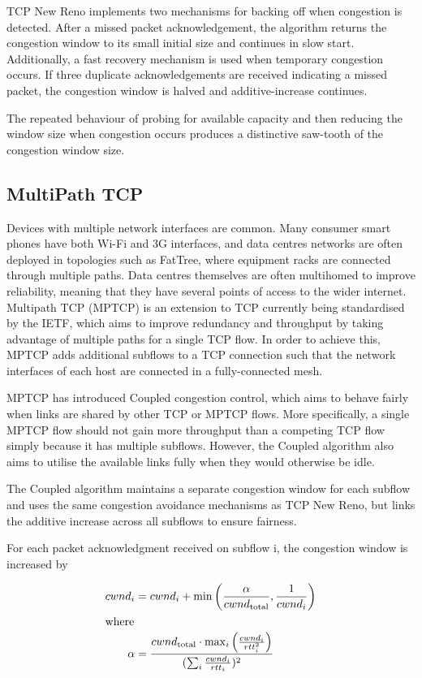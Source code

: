 TCP New Reno implements two mechanisms for backing off when congestion is
detected. After a missed packet acknowledgement, the algorithm returns the
congestion window to its small initial size and continues in slow start.
Additionally, a fast recovery mechanism is used when temporary congestion
occurs. If three duplicate acknowledgements are received indicating a missed
packet, the congestion window is halved and additive-increase continues.

The repeated behaviour of probing for available capacity and then reducing the
window size when congestion occurs produces a distinctive saw-tooth of the
congestion window size.

\subsection{MultiPath TCP}
Devices with multiple network interfaces are common. Many consumer smart phones
have both Wi-Fi and 3G interfaces, and data centres networks are often deployed
in topologies such as FatTree, where equipment racks are connected through
multiple paths. Data centres themselves are often multihomed to improve
reliability, meaning that they have several points of access to the wider
internet. Multipath TCP (MPTCP) is an extension to TCP currently being
standardised by the IETF, which aims to improve redundancy and throughput by
taking advantage of multiple paths for a single TCP flow. In order to achieve
this, MPTCP adds additional subflows to a TCP connection such that the network
interfaces of each host are connected in a fully-connected mesh.

MPTCP has introduced Coupled congestion control, which aims to behave fairly
when links are shared by other TCP or MPTCP flows. More specifically, a single
MPTCP flow should not gain more throughput than a competing TCP flow simply
because it has multiple subflows. However, the Coupled algorithm also aims to
utilise the available links fully when they would otherwise be idle.

The Coupled algorithm maintains a separate congestion window for each subflow
and uses the same congestion avoidance mechanisms as TCP New Reno, but links the
additive increase across all subflows to ensure fairness.

For each packet acknowledgment received on subflow i, the congestion window is
increased by

\begin{align*}
  cwnd_i &= cwnd_i +
    \min\left(\frac{\alpha}{cwnd_\text{total}}, \frac{1}{cwnd_i}\right) \\
  \intertext{where}
  \alpha &=
    \frac{cwnd_\text{total} \cdot \max_i\left(\frac{cwnd_i}{rtt_i^2}\right)}
         {(\sum_i \frac{cwnd_i}{rtt_i})^2}
\end{align*}

